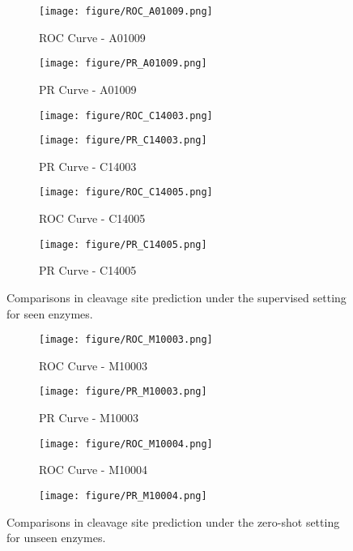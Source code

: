 \begin{figure}[t]
  \centering
  
  \begin{subfigure}{0.48\textwidth}
    \texttt{[image: figure/ROC\_A01009.png]}
    \caption{ROC Curve - A01009}
  \end{subfigure}
  \begin{subfigure}{0.48\textwidth}
    \texttt{[image: figure/PR\_A01009.png]}
    \caption{PR Curve - A01009}
  \end{subfigure}

  \begin{subfigure}{0.48\textwidth}
    \texttt{[image: figure/ROC\_C14003.png]}
  \end{subfigure}
  \begin{subfigure}{0.48\textwidth}
    \texttt{[image: figure/PR\_C14003.png]}
    \caption{PR Curve - C14003}
  \end{subfigure}

  \begin{subfigure}{0.48\textwidth}
    \texttt{[image: figure/ROC\_C14005.png]}
    \caption{ROC Curve - C14005}
  \end{subfigure}
  \begin{subfigure}{0.48\textwidth}
    \texttt{[image: figure/PR\_C14005.png]}
    \caption{PR Curve - C14005}
  \end{subfigure}

  \caption{Comparisons in cleavage site prediction under the supervised setting for seen enzymes. }
\end{figure}

\begin{figure}[t]
  \centering
  \begin{subfigure}{0.48\textwidth}
    \texttt{[image: figure/ROC\_M10003.png]}
    \caption{ROC Curve - M10003}
  \end{subfigure}
  \begin{subfigure}{0.48\textwidth}
    \texttt{[image: figure/PR\_M10003.png]}
    \caption{PR Curve - M10003}
  \end{subfigure}

  \begin{subfigure}{0.48\textwidth}
    \texttt{[image: figure/ROC\_M10004.png]}
    \caption{ROC Curve - M10004}
  \end{subfigure}
  \begin{subfigure}{0.48\textwidth}
    \texttt{[image: figure/PR\_M10004.png]}
  \end{subfigure}

    \caption{Comparisons in cleavage site prediction under the zero-shot setting for unseen enzymes. }
  \label{fig:full_results}
\end{figure}

